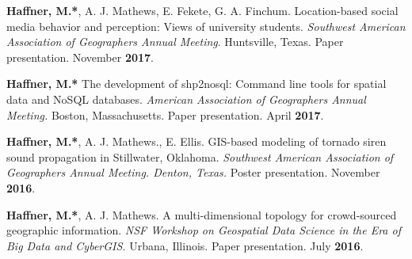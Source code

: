 \begin{cventries}
   \cventry
      {}
      {}
      {}
      {}
      {
        \begin{cvitems}
          \vspace{-2mm}
        \item {\textbf{Haffner, M.*}, A. J. Mathews, E. Fekete, G. A. Finchum.
            Location-based social media behavior and perception: Views of
            university students. \textit{Southwest American Association of
              Geographers Annual Meeting}. Huntsville, Texas. Paper
            presentation. November \textbf{2017}.}
          \end{cvitems}
        } %

   \cventry
      {}
      {}
      {}
      {}
      {
        \begin{cvitems}
          \vspace{-2mm}
        \item {\textbf{Haffner, M.*} The development of shp2nosql: Command line
            tools for spatial data and NoSQL databases. \textit{American
            Association of Geographers Annual Meeting.} Boston, Massachusetts.
            Paper presentation. April \textbf{2017}.}
          \end{cvitems}
        } %

   \cventry
      {}
      {}
      {}
      {}
      {
        \begin{cvitems}
          \vspace{-2mm}
        \item {\textbf{Haffner, M.*}, A. J. Mathews., E. Ellis. GIS-based
            modeling of tornado siren sound propagation in Stillwater, Oklahoma.
            \textit{Southwest American Association of Geographers Annual
              Meeting. Denton, Texas.} Poster presentation. November
            \textbf{2016}.}
            \end{cvitems}
          } %

   \cventry
      {}
      {}
      {}
      {}
      {
        \begin{cvitems}
          \vspace{-2mm}
        \item {\textbf{Haffner, M.*}, A. J. Mathews. A multi-dimensional
            topology for crowd-sourced geographic information. \textit{NSF
              Workshop on Geospatial Data Science in the Era of Big Data and
              CyberGIS.} Urbana, Illinois. Paper presentation. July
            \textbf{2016}.}
          \end{cvitems}
        }


\end{cventries}
